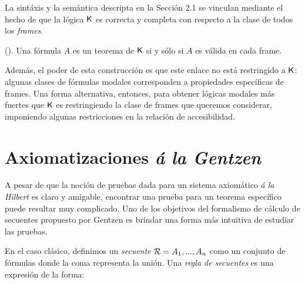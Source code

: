 


 La sintáxis y la semántica descripta en la Sección 2.1 se vinculan mediante el hecho de que la lógica $\mathsf{K}$ es correcta y completa con respecto a la clase de todos los \emph{frames}.

\begin{teo}(\cite{kripke1963}). 
	Una fórmula $A$ es un teorema de $\mathsf{K}$ si y sólo si $A$ es válida en cada frame. 
\end{teo}

Además, el poder de esta construcción es que este enlace no está restringido a $\mathsf{K}$: algunas clases de fórmulas modales corresponden a propiedades específicas de frames. Una forma alternativa, entonces, para obtener lógicas modales más fuertes que $\mathsf{K}$ es restringiendo la clase de frames que queremos considerar, imponiendo algunas restricciones en la relación de accesibilidad.

\section{Axiomatizaciones \emph{á la Gentzen}}
A pesar de que la noción de pruebas dada para un sistema axiomático \emph{á la Hilbert} es claro y amigable, encontrar una prueba para un teorema específico puede resultar muy complicado. Uno de los objetivos del formalismo de cálculo de secuentes propuesto por Gentzen es brindar una forma más intuitiva de estudiar las pruebas. 

En el caso clásico, definimos un \emph{secuente} $\mathcal{R} = A_{1}, ..., A_{n}$ como un conjunto de fórmulas donde la coma representa la unión. Una \emph{regla de secuentes} es una expresión de la forma:


